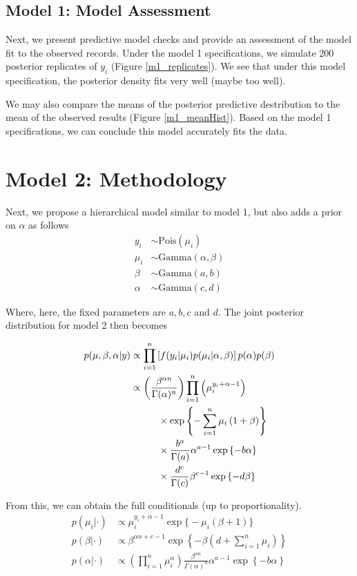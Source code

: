 \documentclass{asaproc}
\newcommand{\prodi}{\prod_{i=1}^n}
\newcommand{\sumi}{\sum_{i=1}^n}
\newcommand\tab[1][1cm]{\hspace*{#1}}
\newcommand{\Pois}{\text{Pois}}
\newcommand{\Gam}{\text{Gamma}}
\begin{document}
\subsection{Model 1: Model Assessment}
Next, we present predictive model checks and provide an assessment of the model fit to the observed records. Under the model 1 specifications, we simulate 200 posterior replicates of $y_i$ (Figure \ref{m1_replicates}). We see that under this model specification, the posterior density fits very well (maybe too well). 



We may also compare the means of the posterior predictive destribution to the mean of the observed results (Figure \ref{m1_meanHist}). Based on the model 1 specifications, we can conclude this model accurately fits the data.


\section{Model 2: Methodology}
Next, we propose a hierarchical model similar to model 1, but also adds a prior on $\alpha$ as follows
\begin{align*}
    y_i &\sim \Pois(\mu_i)\\
    \mu_i &\sim \Gam(\alpha, \beta)\\
    \beta &\sim \Gam(a, b) \\
    \alpha &\sim \Gam(c,d)
\end{align*}

Where, here, the fixed parameters are $a,b,c$ and $d$. The joint posterior distribution for model 2 then becomes

\begin{align*}
    p(\mu, \beta, \alpha|y) & \propto \prodi \left[f(y_i|\mu_i) p(\mu_i|\alpha,\beta) \right] p(\alpha) p(\beta)\\
    &\propto \left(\frac{\beta^{\alpha n}}{\Gamma(\alpha)^n} \right) \prodi \left( \mu_i ^{y_i + \alpha -1}\right) \\
    &\tab\times\exp\left\{
    -\sumi \mu_i \left(1 + \beta\right)\right\}\\
    &\tab \times \frac{b^a}{\Gamma(a)} \alpha^{a-1} \exp\left\{-b\alpha\right\}\\
    &\tab \times\frac{d^c}{\Gamma(c)} \beta^{c-1} \exp\left\{-d\beta \right\}
\end{align*}

From this, we can obtain the full conditionals (up to proportionality).
\begin{align*}
    p(\mu_i|\cdot) &\propto \mu_i^{y_i + \alpha -1} \exp \Big\{-\mu_i(\beta+1) \Big\}\\
    p(\beta|\cdot) & \propto \beta^{\alpha n + c -1} \exp\left\{-\beta\left(d +\sumi \mu_i\right)\right\}\\
    p(\alpha|\cdot) &\propto \left(\prodi \mu_i^\alpha\right)\frac{\beta^{\alpha n}}{\Gamma(\alpha)^n}  \alpha^{a-1} \exp\left\{-b\alpha \right\}
\end{align*}
\end{document}
